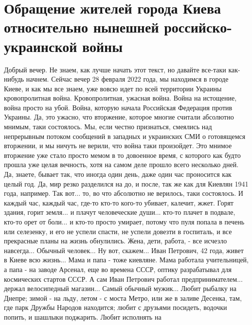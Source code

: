  
 
 
 
 

\section{Обращение жителей города Киева относительно нынешней российско-украинской войны}

Добрый вечер. Не знаем, как лучше начать этот текст, но давайте все-таки
как-нибудь начнем. Сейчас вечер 28 февраля 2022 года, мы находимся в городе
Киеве, и как мы все знаем, уже вовсю идет по всей территории Украины
кровопролитная война. Кровопролитная, ужасная война. Война на истощение, война
просто на убой. Война, которую начала Российская Федерация против Украины. Да,
это ужасно, что вторжение, которое многие считали абсолютно мнимым, таки
состоялось. Мы, если честно признаться, смеялись над непрерывным потоком
сообщений в западных и украинских СМИ о готовящемся вторжении, и мы ничуть не
верили, что война таки произойдет. Это мнимое вторжение уже стало просто мемом
в то довоенное время, с которого как будто прошла уже целая вечность, хотя на
самом деле прошло всего несколько дней. Да, знаете, бывает так, что иногда один
день, даже один час проносится как целый год. Да, мир резко разделился на до, и
после, так же как для Киевлян 1941 года, например. Так вот... то, во что
абсолютно не верилось, таки состоялось. И каждый час, каждый час, где-то кто-то
кого-то убивает, калечит, жжет. Горят здания, горит земля... и плачут
человеческие души...  кто-то плачет в подвале, кто-то орет от боли... и кто-то
просто умирает, потому что пуля попала в печень или селезенку, и его не успели
спасти, не успели довезти в госпиталь, и все прекрасные планы на жизнь
обнулились.  Жена, дети, работа, - все исчезло навсегда... Обычный человек...
Ну вот, скажем...  Иван Петрович, 42 года, живет в Киеве всю жизнь... Мама и
папа - тоже киевляне.  Мама работала учительницей, а папа - на заводе Арсенал,
еще во времена СССР, оптику разрабатывал для космических стартов СССР.  А сам
Иван Петрович работал предпринимателем... держал велосипедный магазин... Самый
обычный мужик...  Любит рыбалку на Днепре; зимой - на льду, летом - с моста
Метро, или же в заливе Десенка, там, где парк Дружбы Народов находится; любит с
друзьями посидеть, водочки попить, и шашлыки поджарить.  Любит исполнять на
